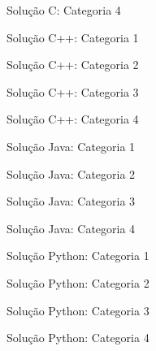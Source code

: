 \begin{frame}[fragile]{Solução C: Categoria 4}
\end{frame}

\begin{frame}[fragile]{Solução C++: Categoria 1}
\end{frame}

\begin{frame}[fragile]{Solução C++: Categoria 2}
\end{frame}

\begin{frame}[fragile]{Solução C++: Categoria 3}
\end{frame}

\begin{frame}[fragile]{Solução C++: Categoria 4}
\end{frame}

\begin{frame}[fragile]{Solução Java: Categoria 1}
\end{frame}

\begin{frame}[fragile]{Solução Java: Categoria 2}
\end{frame}

\begin{frame}[fragile]{Solução Java: Categoria 3}
\end{frame}

\begin{frame}[fragile]{Solução Java: Categoria 4}
\end{frame}

\begin{frame}[fragile]{Solução Python: Categoria 1}
\end{frame}

\begin{frame}[fragile]{Solução Python: Categoria 2}
\end{frame}

\begin{frame}[fragile]{Solução Python: Categoria 3}
\end{frame}

\begin{frame}[fragile]{Solução Python: Categoria 4}
\end{frame}


